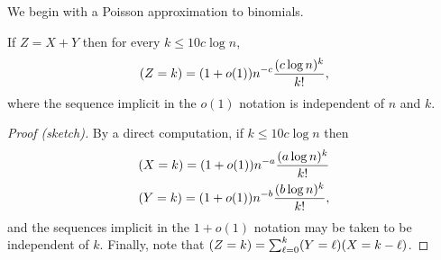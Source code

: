 \documentclass[EJP]{ejpecp}
\newcommand{\1}[1]{\mathbbm{1}_{\{#1\}}}
\let\Pr\relax
\DeclareMathOperator{\Pr}{Pr}
\begin{document}
We begin with a Poisson approximation to binomials.
\begin{lemma}\label{lem:poisson}
  If $Z = X + Y$ then for every $k \le 10 c \log n$,
  \[
      \Pr(Z = k) = (1 + o(1)) n^{-c} \frac{(c \log n)^k}{k!},
  \]
  where the sequence implicit in the $o(1)$ notation is independent of $n$ and $k$.
\end{lemma}

\begin{proof}[Proof (sketch)]
  By a direct computation, if $k \le 10 c \log n$ then
  \begin{align*}
    \Pr(X = k) = (1 + o(1)) n^{-a} \frac{(a \log n)^k}{k!} \\
    \Pr(Y = k) = (1 + o(1)) n^{-b} \frac{(b \log n)^k}{k!},
  \end{align*}
  and the sequences implicit in the $1 + o(1)$ notation may be taken to be
  independent of $k$. Finally, note that
  $\Pr(Z = k) = \sum_{\ell=0}^k \Pr(Y = \ell) \Pr(X = k - \ell)$.
\end{proof}
\end{document}
